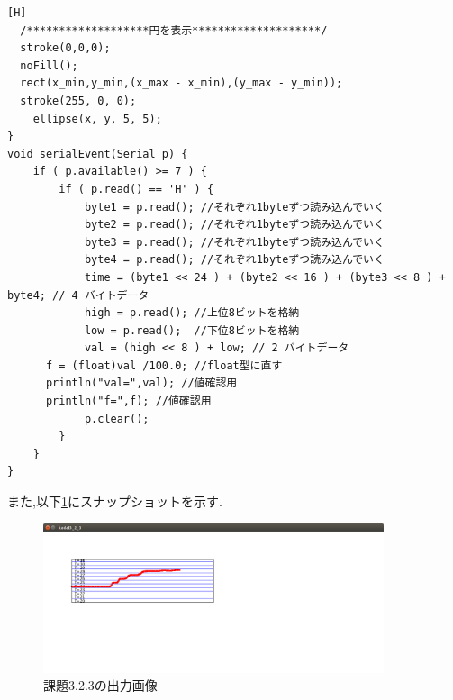 \documentclass{jarticle}
\begin{document}
\begin{lstlisting}[caption = 課題3.2.3(Processing),label=code:kadai3-2-3-p][H]
  /*******************円を表示********************/
  stroke(0,0,0);
  noFill();
  rect(x_min,y_min,(x_max - x_min),(y_max - y_min));
  stroke(255, 0, 0);
	ellipse(x, y, 5, 5);
}
void serialEvent(Serial p) {
	if ( p.available() >= 7 ) {
		if ( p.read() == 'H' ) {
			byte1 = p.read(); //それぞれ1byteずつ読み込んでいく
			byte2 = p.read(); //それぞれ1byteずつ読み込んでいく
			byte3 = p.read(); //それぞれ1byteずつ読み込んでいく
			byte4 = p.read(); //それぞれ1byteずつ読み込んでいく
			time = (byte1 << 24 ) + (byte2 << 16 ) + (byte3 << 8 ) + byte4; // 4 バイトデータ
			high = p.read(); //上位8ビットを格納
			low = p.read();  //下位8ビットを格納
			val = (high << 8 ) + low; // 2 バイトデータ
      f = (float)val /100.0; //float型に直す
      println("val=",val); //値確認用
      println("f=",f); //値確認用
			p.clear();
		}
	}
}
\end{lstlisting}
また,以下\ref{fig:kadai3-2-3}にスナップショットを示す.

\begin{figure}[H]
\begin{center}
\includegraphics[width=10.0cm]{images/kadai3-2-3.png}
\caption{課題3.2.3の出力画像}
\label{fig:kadai3-2-3}
\end{center}
\end{figure}
\end{document}
